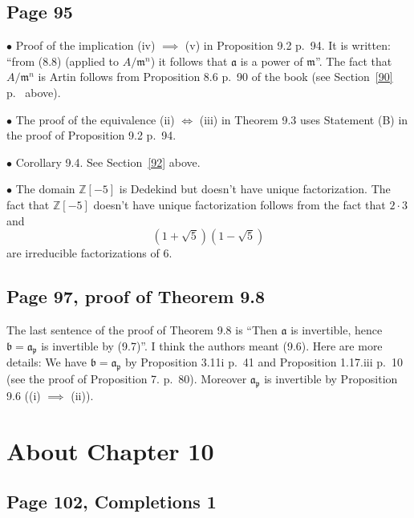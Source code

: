 \documentclass[parskip=half,fontsize=12pt]{scrartcl}%
\newcommand{\mf}{\mathfrak}
\newcommand{\ppp}{\mf p}
\newcommand{\bu}{\bullet}
\begin{document}
\subsection{Page 95}%

$\bu$ Proof of the implication (iv) $\implies$ (v) in Proposition 9.2 p.~94. It is written: ``from (8.8) (applied to $A/\mf m^n$) it follows that $\mf a$ is a power of $\mf m$''. The fact that $A/\mf m^n$ is Artin follows from Proposition 8.6 p.~90 of the book (see Section~\ref{90} p.~\pageref{90} above). %

$\bu$ The proof of the equivalence (ii) $\iff$ (iii) in Theorem 9.3 uses Statement (B) in the proof of Proposition 9.2 p.~94.

$\bu$ Corollary 9.4. See Section~\ref{92} above.

$\bu$ The domain $\mathbb Z[-5]$ is Dedekind but doesn't have unique factorization. %
The fact that $\mathbb Z[-5]$ doesn't have unique factorization follows from the fact that $2\cdot3$ and $$\left(1+\sqrt5\right)\left(1-\sqrt5\right)$$ are irreducible factorizations of $6$.%

\subsection{Page 97, proof of Theorem 9.8}%

The last sentence of the proof of Theorem 9.8 is ``Then $\mf a$ is invertible, hence $\mf b=\mf a_\ppp$ is invertible by (9.7)''. I think the authors meant (9.6). Here are more details: We have $\mf b=\mf a_\ppp$ by Proposition 3.11i p.~41 and Proposition 1.17.iii p.~10 (see the proof of Proposition 7. p.~80). Moreover $\mf a_\ppp$ is invertible by Proposition 9.6 ((i) $\implies$ (ii)).

\section{About Chapter 10}%

\subsection{Page 102, Completions 1}%
\end{document}

